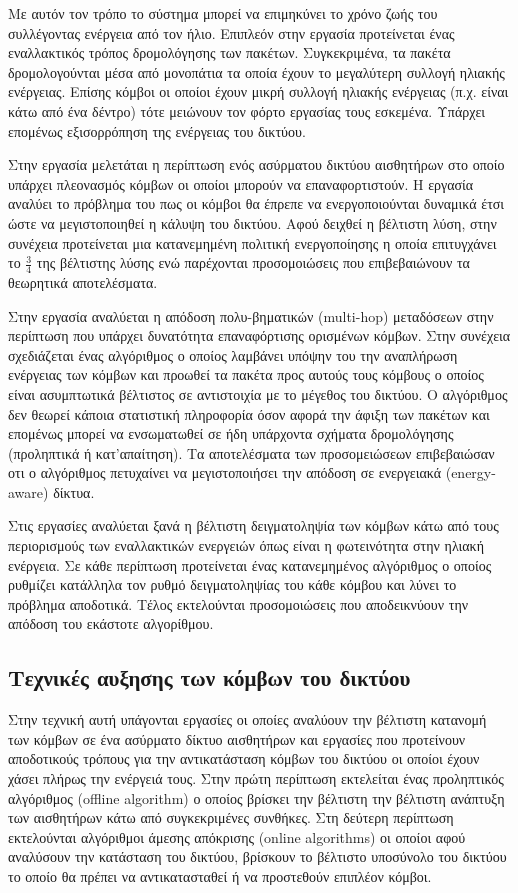 Με αυτόν τον τρόπο το σύστημα μπορεί να επιμηκύνει το χρόνο ζωής του συλλέγοντας ενέργεια από τον ήλιο. Επιπλεόν στην εργασία προτείνεται ένας εναλλακτικός τρόπος
δρομολόγησης των πακέτων. Συγκεκριμένα, τα πακέτα δρομολογούνται μέσα από μονοπάτια τα οποία έχουν το μεγαλύτερη συλλογή ηλιακής ενέργειας. Επίσης κόμβοι οι οποίοι
έχουν μικρή συλλογή ηλιακής ενέργειας (π.χ. είναι κάτω από ένα δέντρο) τότε μειώνουν τον φόρτο εργασίας τους εσκεμένα. Υπάρχει επομένως εξισορρόπηση της ενέργειας
του δικτύου.

Στην εργασία \cite{harvesting_6} μελετάται η περίπτωση ενός ασύρματου δικτύου αισθητήρων στο οποίο υπάρχει πλεονασμός κόμβων οι οποίοι μπορούν να
επαναφορτιστούν. Η εργασία αναλύει το πρόβλημα του πως οι κόμβοι θα έπρεπε να ενεργοποιούνται δυναμικά έτσι ώστε να μεγιστοποιηθεί η κάλυψη του δικτύου. Αφού δειχθεί
η βέλτιστη λύση, στην συνέχεια προτείνεται μια κατανεμημένη πολιτική ενεργοποίησης η οποία επιτυγχάνει το $\frac{3}{4}$ της βέλτιστης λύσης ενώ παρέχονται
προσομοιώσεις που επιβεβαιώνουν τα θεωρητικά αποτελέσματα.

Στην εργασία \cite{harvesting_7} αναλύεται η απόδοση πολυ-βηματικών (multi-hop) μεταδόσεων στην περίπτωση που υπάρχει δυνατότητα επαναφόρτισης ορισμένων κόμβων. Στην
συνέχεια σχεδιάζεται ένας αλγόριθμος ο οποίος λαμβάνει υπόψην του την αναπλήρωση ενέργειας των κόμβων και προωθεί τα πακέτα προς αυτούς τους κόμβους ο οποίος είναι
ασυμπτωτικά βέλτιστος σε αντιστοιχία με το μέγεθος του δικτύου. Ο αλγόριθμος δεν θεωρεί κάποια στατιστική πληροφορία όσον αφορά την άφιξη των πακέτων και επομένως
μπορεί να ενσωματωθεί σε ήδη υπάρχοντα σχήματα δρομολόγησης (προληπτικά ή κατ'απαίτηση). Τα αποτελέσματα των προσομειώσεων επιβεβαιώσαν οτι ο αλγόριθμος πετυχαίνει
να μεγιστοποιήσει την απόδοση σε ενεργειακά (energy-aware) δίκτυα.

Στις εργασίες \cite{harvesting_8} \cite{harvesting_9} αναλύεται ξανά η βέλτιστη δειγματοληψία των κόμβων κάτω από τους περιορισμούς των εναλλακτικών ενεργειών όπως
είναι η φωτεινότητα στην ηλιακή ενέργεια. Σε κάθε περίπτωση προτείνεται ένας κατανεμημένος αλγόριθμος ο οποίος ρυθμίζει κατάλληλα τον ρυθμό δειγματοληψίας του κάθε
κόμβου και λύνει το πρόβλημα αποδοτικά. Τέλος εκτελούνται προσομοιώσεις που αποδεικνύουν την απόδοση του εκάστοτε αλγορίθμου.



\subsection{Τεχνικές αυξησης των κόμβων του δικτύου}
Στην τεχνική αυτή υπάγονται εργασίες οι οποίες αναλύουν την βέλτιστη κατανομή των κόμβων σε ένα ασύρματο δίκτυο αισθητήρων και εργασίες που προτείνουν αποδοτικούς
τρόπους για την αντικατάσταση κόμβων του δικτύου οι οποίοι έχουν χάσει πλήρως την ενέργειά τους. Στην πρώτη περίπτωση εκτελείται ένας προληπτικός αλγόριθμος (offline
algorithm) ο οποίος βρίσκει την βέλτιστη την βέλτιστη ανάπτυξη των αισθητήρων κάτω από συγκεκριμένες συνθήκες. Στη δεύτερη περίπτωση εκτελούνται αλγόριθμοι άμεσης
απόκρισης (online algorithms) οι οποίοι αφού αναλύσουν την κατάσταση του δικτύου, βρίσκουν το βέλτιστο υποσύνολο του δικτύου το οποίο θα πρέπει να αντικατασταθεί ή
να προστεθούν επιπλέον κόμβοι.

